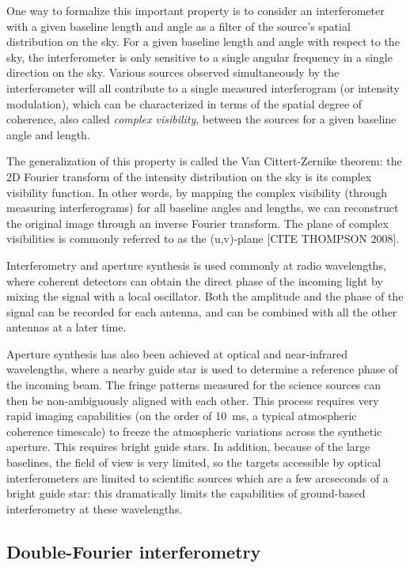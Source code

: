 One way to formalize this important property is to consider an interferometer with a given baseline length and angle as a filter of the source's spatial distribution on the sky. For a given baseline length and angle with respect to the sky, the interferometer is only sensitive to a single angular frequency in a single direction on the sky. Various sources observed simultaneously by the interferometer will all contribute to a single measured interferogram (or intensity modulation), which can be characterized in terms of the spatial degree of coherence, also called \textit{complex visibility}, between the sources for a given baseline angle and length. 

The generalization of this property is called the Van Cittert-Zernike theorem: the 2D Fourier transform of the intensity distribution on the sky is its complex visibility function. In other words, by mapping the complex visibility (through measuring interferograms) for all baseline angles and lengths, we can reconstruct the original image through an inverse Fourier transform. The plane of complex visibilities is commonly referred to as the (u,v)-plane [CITE THOMPSON 2008].

Interferometry and aperture synthesis is used commonly at radio wavelengths, where coherent detectors can obtain the direct phase of the incoming light by mixing the signal with a local oscillator. Both the amplitude and the phase of the signal can be recorded for each antenna, and can be combined with all the other antennas at a later time.

Aperture synthesis has also been achieved at optical and near-infrared wavelengths, where a nearby guide star is used to determine a reference phase of the incoming beam. The fringe patterns measured for the science sources can then be non-ambiguously aligned with each other. This process requires very rapid imaging capabilities (on the order of \SI{10}{\milli\second}, a typical atmospheric coherence timescale) to freeze the atmospheric variations across the synthetic aperture. This requires bright guide stars. In addition, because of the large baselines, the field of view is very limited, so the targets accessible by optical interferometers are limited to scientific sources which are a few arcseconds of a bright guide star: this dramatically limits the capabilities of ground-based interferometry at these wavelengths.


\subsection{Double-Fourier interferometry}


